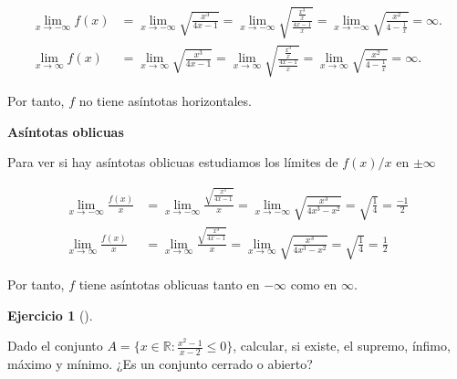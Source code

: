 \documentclass[
  a4paper,
]{scrreport}
\theoremstyle{definition}
\newtheorem{exercise}{Ejercicio}[chapter]
\theoremstyle{remark}
\begin{document}
\begin{tcolorbox}
\begin{align*}
\lim_{x\to-\infty}f(x) &=  \lim_{x\to-\infty} \sqrt{\frac{x^3}{4x-1}} = \lim_{x\to-\infty} \sqrt{\frac{\frac{x^3}{x}}{\frac{4x-1}{x}}} = \lim_{x\to-\infty} \sqrt{\frac{x^2}{4-\frac{1}{x}}} = \infty.\\
\lim_{x\to\infty}f(x) &=  \lim_{x\to\infty} \sqrt{\frac{x^3}{4x-1}} = \lim_{x\to\infty} \sqrt{\frac{\frac{x^3}{x}}{\frac{4x-1}{x}}} = \lim_{x\to\infty} \sqrt{\frac{x^2}{4-\frac{1}{x}}} = \infty.
\end{align*}

Por tanto, \(f\) no tiene asíntotas horizontales.

\textbf{Asíntotas oblicuas}

Para ver si hay asíntotas oblicuas estudiamos los límites de \(f(x)/x\)
en \(\pm\infty\)

\begin{align*}
\lim_{x\to-\infty}\frac{f(x)}{x} &=  \lim_{x\to-\infty} \frac{\sqrt{\frac{x^3}{4x-1}}}{x} = \lim_{x\to-\infty} \sqrt{\frac{x^3}{4x^3-x^2}} = \sqrt{\frac{1}{4}} = \frac{-1}{2}\\
\lim_{x\to\infty}\frac{f(x)}{x} &=  \lim_{x\to\infty} \frac{\sqrt{\frac{x^3}{4x-1}}}{x} = \lim_{x\to\infty} \sqrt{\frac{x^3}{4x^3-x^2}} = \sqrt{\frac{1}{4}} = \frac{1}{2}
\end{align*}

Por tanto, \(f\) tiene asíntotas oblicuas tanto en \(-\infty\) como en
\(\infty\).

\end{tcolorbox}

\begin{exercise}[]\protect\hypertarget{exr-5}{}\label{exr-5}

Dado el conjunto \(A=\{x\in\mathbb{R} : \frac{x^2-1}{x-2}\leq 0\}\),
calcular, si existe, el supremo, ínfimo, máximo y mínimo. ¿Es un
conjunto cerrado o abierto?

\end{exercise}
\end{document}
